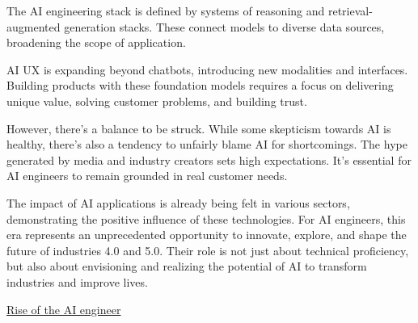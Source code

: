 \documentclass[
  letterpaper,
  DIV=11,
  numbers=noendperiod]{scrartcl}
\begin{document}
The AI engineering stack is defined by systems of reasoning and
retrieval-augmented generation stacks. These connect models to diverse
data sources, broadening the scope of application.

AI UX is expanding beyond chatbots, introducing new modalities and
interfaces. Building products with these foundation models requires a
focus on delivering unique value, solving customer problems, and
building trust.

However, there's a balance to be struck. While some skepticism towards
AI is healthy, there's also a tendency to unfairly blame AI for
shortcomings. The hype generated by media and industry creators sets
high expectations. It's essential for AI engineers to remain grounded in
real customer needs.

The impact of AI applications is already being felt in various sectors,
demonstrating the positive influence of these technologies. For AI
engineers, this era represents an unprecedented opportunity to innovate,
explore, and shape the future of industries 4.0 and 5.0. Their role is
not just about technical proficiency, but also about envisioning and
realizing the potential of AI to transform industries and improve lives.

\href{https://www.latent.space/p/aies-podrocket}{Rise of the AI
engineer}
\end{document}
